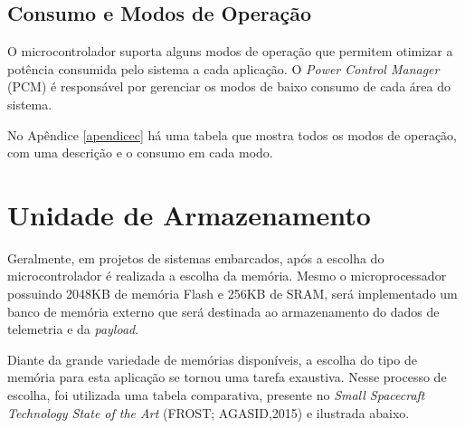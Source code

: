 \subsection{Consumo e Modos de Operação}

O microcontrolador suporta alguns modos de operação que permitem otimizar a potência consumida pelo sistema a cada aplicação. O \textit{Power Control Manager} (PCM) é responsável por gerenciar os modos de baixo consumo de cada área do sistema. 
	
    No Apêndice \ref{apendicec} há uma tabela que mostra todos os modos de operação, com uma descrição e o consumo em cada modo.

\section{Unidade de Armazenamento}

Geralmente, em projetos de sistemas embarcados, após a escolha do microcontrolador é realizada a escolha da memória. Mesmo o microprocessador possuindo 2048KB de memória Flash e 256KB de SRAM, será implementado um banco de memória externo que será destinada ao armazenamento do dados de telemetria e da \textit{payload}.

Diante da grande variedade de memórias disponíveis, a escolha do tipo de memória para esta aplicação se tornou uma tarefa exaustiva. Nesse processo de escolha, foi utilizada uma tabela comparativa, presente no \textit{Small Spacecraft Technology State of the Art} (FROST; AGASID,2015) e ilustrada abaixo.


